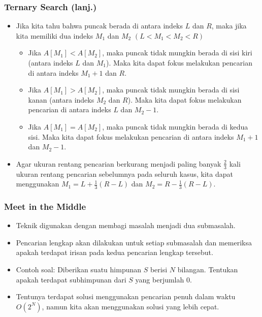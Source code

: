 \begin{frame}
\frametitle{Ternary Search (lanj.)}
\begin{itemize}
  \item Jika kita tahu bahwa puncak \farray berada di antara indeks $L$ dan $R$, maka jika kita memiliki dua indeks $M_1$ dan $M_2$ $(L < M_1 < M_2 < R)$
  \begin{itemize}
    \item Jika $A[M_1] < A[M_2]$, maka puncak \farray tidak mungkin berada di sisi kiri (antara indeks $L$ dan $M_1$). Maka kita dapat fokus melakukan pencarian di antara indeks $M_1 + 1$ dan $R$.
    \item Jika $A[M_1] > A[M_2]$, maka puncak \farray tidak mungkin berada di sisi kanan (antara indeks $M_2$ dan $R$). Maka kita dapat fokus melakukan pencarian di antara indeks $L$ dan $M_2 - 1$.
    \item Jika $A[M_1] = A[M_2]$, maka puncak \farray tidak mungkin berada di kedua sisi. Maka kita dapat fokus melakukan pencarian di antara indeks $M_1 + 1$ dan $M_2 - 1$.
  \end{itemize}
  \item Agar ukuran rentang pencarian berkurang menjadi paling banyak $\frac{2}{3}$ kali ukuran rentang pencarian sebelumnya pada seluruh kasus, kita dapat menggunakan $M_1 = L + \frac{1}{3}(R - L)$ dan $M_2 = R - \frac{1}{3}(R - L)$.
\end{itemize}
\end{frame}

\begin{frame}
\frametitle{Meet in the Middle}
\begin{itemize}
  \item Teknik  digunakan dengan membagi masalah menjadi dua submasalah.
  \item Pencarian lengkap akan dilakukan untuk setiap submasalah dan memeriksa apakah terdapat irisan pada kedua pencarian lengkap tersebut.
  \item Contoh soal: Diberikan suatu himpunan $S$ berisi $N$ bilangan. Tentukan apakah terdapat subhimpunan dari $S$ yang berjumlah $0$.
  \item Tentunya terdapat solusi menggunakan pencarian penuh dalam waktu $O(2^N)$, namun kita akan menggunakan solusi yang lebih cepat.
\end{itemize}
\end{frame}

